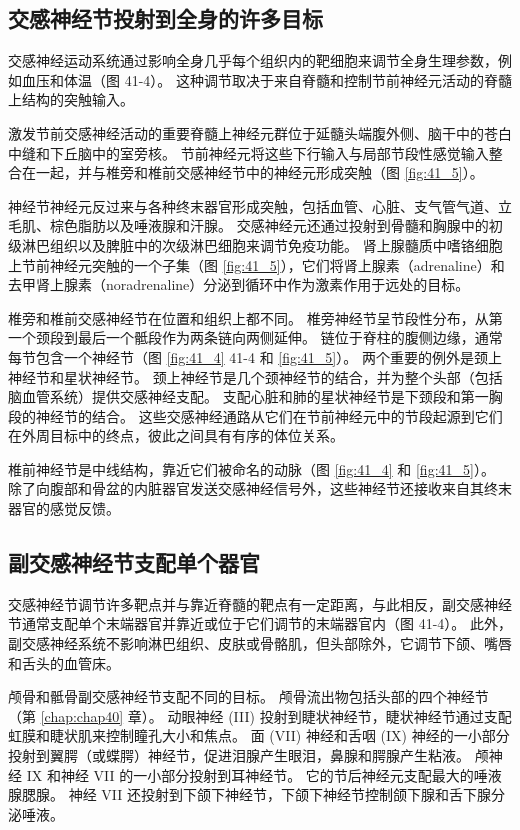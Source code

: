\subsection{交感神经节投射到全身的许多目标}
交感神经运动系统通过影响全身几乎每个组织内的靶细胞来调节全身生理参数，例如血压和体温（图 41-4）。 这种调节取决于来自脊髓和控制节前神经元活动的脊髓上结构的突触输入。

激发节前交感神经活动的重要脊髓上神经元群位于延髓头端腹外侧、脑干中的苍白中缝和下丘脑中的室旁核。 节前神经元将这些下行输入与局部节段性感觉输入整合在一起，并与椎旁和椎前交感神经节中的神经元形成突触（图 \ref{fig:41_5}）。

神经节神经元反过来与各种终末器官形成突触，包括血管、心脏、支气管气道、立毛肌、棕色脂肪以及唾液腺和汗腺。 交感神经元还通过投射到骨髓和胸腺中的初级淋巴组织以及脾脏中的次级淋巴细胞来调节免疫功能。 肾上腺髓质中嗜铬细胞上节前神经元突触的一个子集（图 \ref{fig:41_5}），它们将肾上腺素（adrenaline）和去甲肾上腺素（noradrenaline）分泌到循环中作为激素作用于远处的目标。

椎旁和椎前交感神经节在位置和组织上都不同。 椎旁神经节呈节段性分布，从第一个颈段到最后一个骶段作为两条链向两侧延伸。 链位于脊柱的腹侧边缘，通常每节包含一个神经节（图 \ref{fig:41_4} 41-4 和 \ref{fig:41_5}）。 两个重要的例外是颈上神经节和星状神经节。 颈上神经节是几个颈神经节的结合，并为整个头部（包括脑血管系统）提供交感神经支配。 支配心脏和肺的星状神经节是下颈段和第一胸段的神经节的结合。 这些交感神经通路从它们在节前神经元中的节段起源到它们在外周目标中的终点，彼此之间具有有序的体位关系。

椎前神经节是中线结构，靠近它们被命名的动脉（图 \ref{fig:41_4} 和 \ref{fig:41_5}）。 除了向腹部和骨盆的内脏器官发送交感神经信号外，这些神经节还接收来自其终末器官的感觉反馈。

\subsection{副交感神经节支配单个器官}
交感神经节调节许多靶点并与靠近脊髓的靶点有一定距离，与此相反，副交感神经节通常支配单个末端器官并靠近或位于它们调节的末端器官内（图 41-4）。 此外，副交感神经系统不影响淋巴组织、皮肤或骨骼肌，但头部除外，它调节下颌、嘴唇和舌头的血管床。

颅骨和骶骨副交感神经节支配不同的目标。 颅骨流出物包括头部的四个神经节（第 \ref{chap:chap40} 章）。 动眼神经 (III) 投射到睫状神经节，睫状神经节通过支配虹膜和睫状肌来控制瞳孔大小和焦点。 面 (VII) 神经和舌咽 (IX) 神经的一小部分投射到翼腭（或蝶腭）神经节，促进泪腺产生眼泪，鼻腺和腭腺产生粘液。 颅神经 IX 和神经 VII 的一小部分投射到耳神经节。 它的节后神经元支配最大的唾液腺腮腺。 神经 VII 还投射到下颌下神经节，下颌下神经节控制颌下腺和舌下腺分泌唾液。

